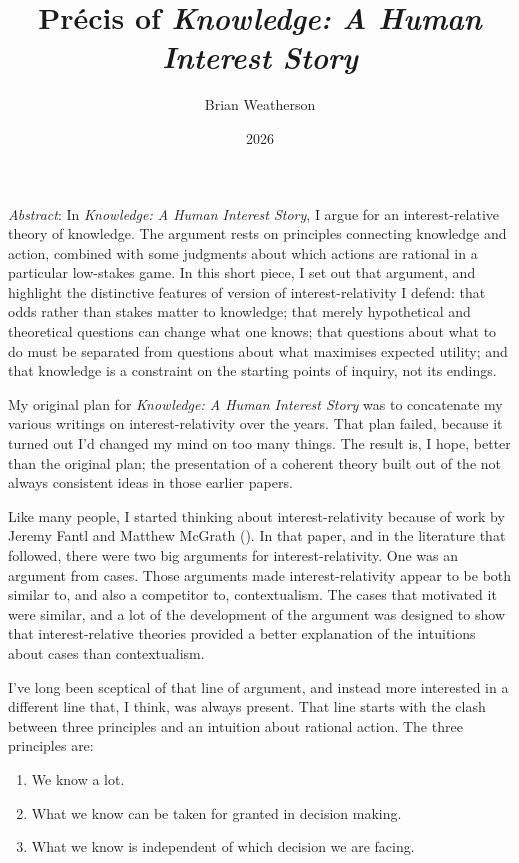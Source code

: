 \documentclass[
  11pt,
  letterpaper,
  DIV=11,
  numbers=noendperiod,
  twoside]{scrartcl}
\title{Précis of \emph{Knowledge: A Human Interest Story}}
\author{Brian Weatherson}
\date{2026}
\providecommand{\tightlist}{%
  \setlength{\itemsep}{0pt}\setlength{\parskip}{0pt}}
\renewenvironment{abstract}
 {\vspace{-1.25cm}
 \quotation\small\noindent\emph{Abstract}:}
 {\endquotation}
\renewenvironment{abstract}
 {\quotation\small\noindent\emph{Abstract}:}
 {\endquotation\vspace{-0.02cm}}
\begin{document}
\maketitle
\begin{abstract}
In \emph{Knowledge: A Human Interest Story}, I argue for an
interest-relative theory of knowledge. The argument rests on principles
connecting knowledge and action, combined with some judgments about
which actions are rational in a particular low-stakes game. In this
short piece, I set out that argument, and highlight the distinctive
features of version of interest-relativity I defend: that odds rather
than stakes matter to knowledge; that merely hypothetical and
theoretical questions can change what one knows; that questions about
what to do must be separated from questions about what maximises
expected utility; and that knowledge is a constraint on the starting
points of inquiry, not its endings.
\end{abstract}


My original plan for \emph{Knowledge: A Human Interest Story} was to
concatenate my various writings on interest-relativity over the years.
That plan failed, because it turned out I'd changed my mind on too many
things. The result is, I hope, better than the original plan; the
presentation of a coherent theory built out of the not always consistent
ideas in those earlier papers.

Like many people, I started thinking about interest-relativity because
of work by Jeremy Fantl and Matthew McGrath
(). In that paper, and in the
literature that followed, there were two big arguments for
interest-relativity. One was an argument from cases. Those arguments
made interest-relativity appear to be both similar to, and also a
competitor to, contextualism. The cases that motivated it were similar,
and a lot of the development of the argument was designed to show that
interest-relative theories provided a better explanation of the
intuitions about cases than contextualism.

I've long been sceptical of that line of argument, and instead more
interested in a different line that, I think, was always present. That
line starts with the clash between three principles and an intuition
about rational action. The three principles are:

\begin{enumerate}
\def\labelenumi{\arabic{enumi}.}
\tightlist
\item
  We know a lot.
\item
  What we know can be taken for granted in decision making.
\item
  What we know is independent of which decision we are facing.
\end{enumerate}
\end{document}
